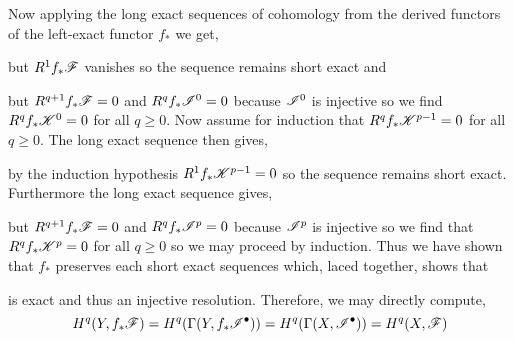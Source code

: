 \documentclass[12pt]{article}
\begin{document}
\begin{center}
\end{center}
Now applying the long exact sequences of cohomology from the derived functors of the left-exact functor $f_*$ we get,
\begin{center}
\end{center}
but $R^1 f_* \mathscr{F}$ vanishes so the sequence remains short exact and 
\begin{center}
\end{center}
but $R^{q+1} f_* \mathscr{F} = 0$ and $R^q f_* \mathscr{I}^0 = 0$ because $\mathscr{I}^0$ is injective so we find $R^q f_* \mathscr{K}^0 = 0$ for all $q \ge 0$. Now assume for induction that $R^q f_* \mathscr{K}^{p - 1} = 0$ for all $q \ge 0$. The long exact sequence then gives,
\begin{center}
\end{center}
by the induction hypothesis $R^1 f_* \mathscr{K}^{p - 1} = 0$ so the sequence remains short exact. Furthermore the long exact sequence gives,
\begin{center}
\end{center}
but $R^{q+1} f_* \mathscr{F} = 0$ and $R^q f_* \mathscr{I}^p = 0$ because $\mathscr{I}^p$ is injective so we find that $R^q f_* \mathscr{K}^p = 0$ for all $q \ge 0$ so we may proceed by induction. Thus we have shown that $f_*$ preserves each short exact sequences which, laced together, shows that
\begin{center}
\end{center}
is exact and thus an injective resolution. Therefore, we may directly compute,
\[ H^q(Y, f_* \mathscr{F}) = H^q(\Gamma(Y, f_* \mathscr{I}^\bullet)) = H^q(\Gamma(X, \mathscr{I}^\bullet)) = H^q(X, \mathscr{F}) \]
\end{document}
